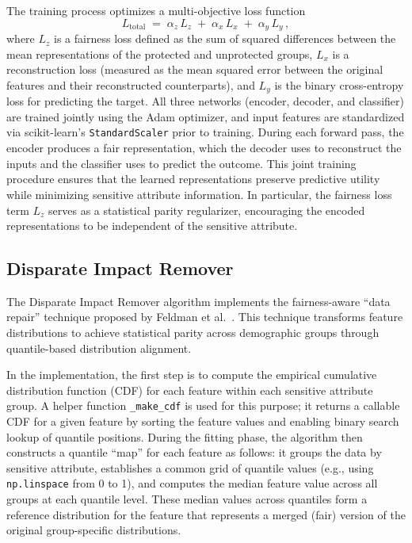 \documentclass[12pt,a4paper,openright,twoside]{book}
\begin{document}
The training process optimizes a multi-objective loss function 
\[ 
L_{\text{total}} \;=\; \alpha_z\,L_z \;+\; \alpha_x\,L_x \;+\; \alpha_y\,L_y\,,
\] 
where $L_z$ is a fairness loss defined as the sum of squared differences between the mean representations of the protected and unprotected groups, $L_x$ is a reconstruction loss (measured as the mean squared error between the original features and their reconstructed counterparts), and $L_y$ is the binary cross-entropy loss for predicting the target. All three networks (encoder, decoder, and classifier) are trained jointly using the Adam optimizer, and input features are standardized via scikit-learn’s \texttt{StandardScaler} prior to training. During each forward pass, the encoder produces a fair representation, which the decoder uses to reconstruct the inputs and the classifier uses to predict the outcome. This joint training procedure ensures that the learned representations preserve predictive utility while minimizing sensitive attribute information. In particular, the fairness loss term $L_z$ serves as a statistical parity regularizer, encouraging the encoded representations to be independent of the sensitive attribute.

\subsection{Disparate Impact Remover}
The Disparate Impact Remover algorithm implements the fairness-aware “data repair” technique proposed by Feldman et al.~\cite{feldman2015certifyingremovingdisparateimpact}. This technique transforms feature distributions to achieve statistical parity across demographic groups through quantile-based distribution alignment.

In the implementation, the first step is to compute the empirical cumulative distribution function (CDF) for each feature within each sensitive attribute group. A helper function \texttt{\_make\_cdf} is used for this purpose; it returns a callable CDF for a given feature by sorting the feature values and enabling binary search lookup of quantile positions. During the fitting phase, the algorithm then constructs a quantile “map” for each feature as follows: it groups the data by sensitive attribute, establishes a common grid of quantile values (e.g., using \texttt{np.linspace} from 0 to 1), and computes the median feature value across all groups at each quantile level. These median values across quantiles form a reference distribution for the feature that represents a merged (fair) version of the original group-specific distributions.
\end{document}
